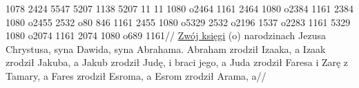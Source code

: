 \documentclass{article}
\newcommand{\vs}[1]{{\bfseries\versefont #1}}
\begin{document}
\exdisplay
\begingl
{} {} 1078 2424 5547 5207 1138 5207 11 {} 11 1080 o2464 1161 2464 1080 o2384 1161 2384 1080 o2455 2532 o80 846 {} 1161 2455 1080 o5329 2532 o2196 1537 o2283 1161 5329 1080 o2074 1161 2074 1080 o689 {} 1161//
\glb \underline{Zwój księgi} (o) narodzinach Jezusa Chrystusa, syna Dawida, syna Abrahama. \vs{2} Abraham zrodził Izaaka, a Izaak zrodził Jakuba, a Jakub zrodził Judę, i braci jego, \vs{3} a Juda zrodził Faresa i Zarę z Tamary, a Fares zrodził Esroma, a Esrom zrodził Arama, \vs{4} a//
\endgl
\xe
\end{document}
